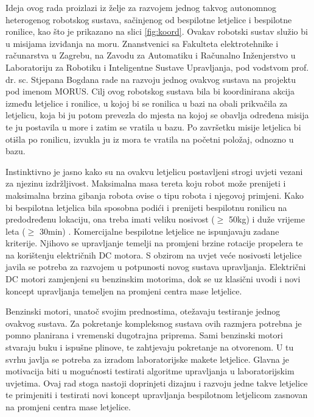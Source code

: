 \documentclass[11pt,a4paper]{article}
\begin{document}
Ideja ovog rada proizlazi iz želje za razvojem jednog takvog autonomnog heterogenog robotskog sustava, sačinjenog od bespilotne letjelice i bespilotne ronilice, kao što je prikazano na slici \ref{fig:koord}. Ovakav robotski sustav služio bi u misijama izviđanja na moru. Znanstvenici sa Fakulteta elektrotehnike i računarstva u Zagrebu, na Zavodu za Automatiku i Računalno Inženjerstvo u Laboratoriju za Robotiku i Inteligentne Sustave Upravljanja, pod vodstvom prof. dr. sc. Stjepana Bogdana rade na razvoju jednog ovakvog sustava na projektu pod imenom MORUS. Cilj ovog robotskog sustava bila bi koordinirana akcija između letjelice i ronilice, u kojoj bi se ronilica u bazi na obali prikvačila za letjelicu, koja bi ju potom prevezla do mjesta na kojoj se obavlja određena misija te ju postavila u more i zatim se vratila u bazu. Po završetku misije letjelica bi otišla po ronilicu, izvukla ju iz mora te vratila na početni položaj, odnozno u bazu. \cite{haus2}


\medskip


Instinktivno je jasno kako su na ovakvu letjelicu postavljeni strogi uvjeti vezani za njezinu izdržljivost. Maksimalna masa tereta koju robot može prenijeti i maksimalna brzina gibanja robota ovise o tipu robota i njegovoj primjeni. \cite{kova}  Kako bi bespilotna letjelica bila sposobna podići i prenijeti bespilotnu ronilicu na predodređenu lokaciju, ona treba imati veliku nosivost ($\geq$ 50kg) i duže vrijeme leta ($\geq$ 30min) . Komercijalne bespilotne letjelice ne ispunjavaju zadane kriterije. Njihovo se upravljanje temelji na promjeni brzine rotacije propelera te na korištenju električnih DC motora. S obzirom na uvjet veće nosivosti letjelice javila se potreba za razvojem u potpunosti novog sustava upravljanja. Električni DC motori zamjenjeni su benzinskim motorima, dok se uz klasični uvodi i novi koncept upravljanja temeljen na promjeni centra mase letjelice. \cite{haus1}

\medskip

Benzinski motori, unatoč svojim prednostima, otežavaju testiranje jednog ovakvog sustava. Za pokretanje kompleksnog sustava ovih razmjera potrebna je pomno planirana i vremenski dugotrajna priprema. Sami benzinski motori stvaraju buku i ispušne plinove, te zahtjevaju pokretanje na otvorenom. U tu svrhu javlja se potreba za izradom laboratorijske makete letjelice. Glavna je motivacija biti u mogućnosti testirati algoritme upravljanja u laboratorijskim uvjetima. Ovaj rad stoga nastoji doprinjeti dizajnu i razvoju jedne takve letjelice te primjeniti i testirati novi koncept upravljanja bespilotnom letjelicom zasnovan na promjeni centra mase letjelice. 
\end{document}
